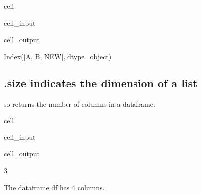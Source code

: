 \documentclass[letterpaper,10pt,english]{jupyterBook}
\begin{document}
\begin{sphinxuseclass}{cell}\begin{sphinxVerbatimInput}

\begin{sphinxuseclass}{cell_input}
\begin{sphinxVerbatim}[commandchars=\\\{\}]
\end{sphinxVerbatim}

\end{sphinxuseclass}\end{sphinxVerbatimInput}
\begin{sphinxVerbatimOutput}

\begin{sphinxuseclass}{cell_output}
\begin{sphinxVerbatim}[commandchars=\\\{\}]
Index([\PYGZsq{}A\PYGZsq{}, \PYGZsq{}B\PYGZsq{}, \PYGZsq{}NEW\PYGZsq{}], dtype=\PYGZsq{}object\PYGZsq{})
\end{sphinxVerbatim}

\end{sphinxuseclass}\end{sphinxVerbatimOutput}

\end{sphinxuseclass}

\subsection{.size indicates the dimension of a list}
\label{\detokenize{content/04_PythonEssentials/PythonPandasDataframes:size-indicates-the-dimension-of-a-list}}
\sphinxAtStartPar
so  returns the number of columns in a dataframe.

\begin{sphinxuseclass}{cell}\begin{sphinxVerbatimInput}

\begin{sphinxuseclass}{cell_input}
\begin{sphinxVerbatim}[commandchars=\\\{\}]
\end{sphinxVerbatim}

\end{sphinxuseclass}\end{sphinxVerbatimInput}
\begin{sphinxVerbatimOutput}

\begin{sphinxuseclass}{cell_output}
\begin{sphinxVerbatim}[commandchars=\\\{\}]
3
\end{sphinxVerbatim}

\end{sphinxuseclass}\end{sphinxVerbatimOutput}

\end{sphinxuseclass}
\sphinxAtStartPar
The dataframe df has 4 columns.
\end{document}
